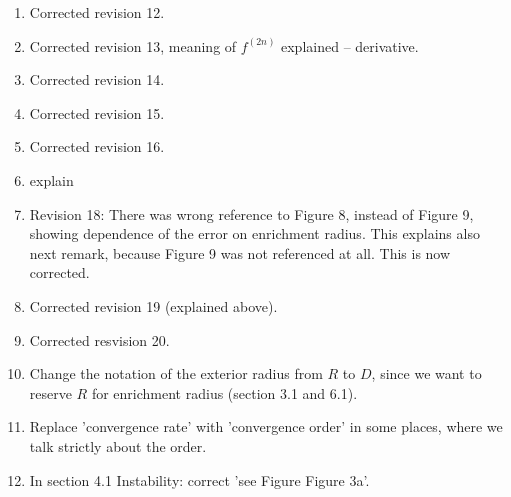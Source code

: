 \documentclass[a4paper,11pt]{article}
\begin{document}
\begin{enumerate}
\item Corrected revision 12. %
\item Corrected revision 13, meaning of $f^{(2n)}$ explained -- derivative. %
\item Corrected revision 14. %
\item Corrected revision 15. %
\item Corrected revision 16. %

\item explain%

\item Revision 18: There was wrong reference to Figure 8, instead of Figure 9, showing dependence of the error on enrichment radius. %
      This explains also next remark, because Figure 9 was not referenced at all.
      This is now corrected. %
\item Corrected revision 19 (explained above). %
\item Corrected resvision 20. %
\item Change the notation of the exterior radius from $R$ to $D$, since we want to reserve $R$ for enrichment radius (section 3.1 and 6.1).
\item Replace 'convergence rate' with 'convergence order' in some places, where we talk strictly about the order.
\item In section 4.1 Instability: correct 'see Figure Figure 3a'.

\end{enumerate} 
\end{document}

